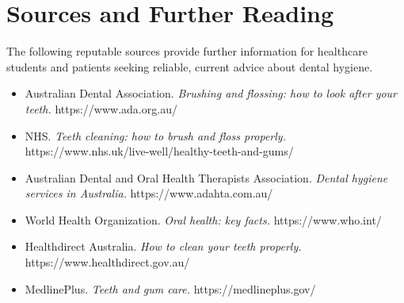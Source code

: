 \section*{Sources and Further Reading}
The following reputable sources provide further information for healthcare students and patients seeking reliable, current advice about dental hygiene.

\begin{itemize}
    \item Australian Dental Association. \textit{Brushing and flossing: how to look after your teeth.} https://www.ada.org.au/
    \item NHS. \textit{Teeth cleaning: how to brush and floss properly.} https://www.nhs.uk/live-well/healthy-teeth-and-gums/
    \item Australian Dental and Oral Health Therapists Association. \textit{Dental hygiene services in Australia.} https://www.adahta.com.au/
    \item World Health Organization. \textit{Oral health: key facts.} https://www.who.int/
    \item Healthdirect Australia. \textit{How to clean your teeth properly.} https://www.healthdirect.gov.au/
    \item MedlinePlus. \textit{Teeth and gum care.} https://medlineplus.gov/
\end{itemize}
